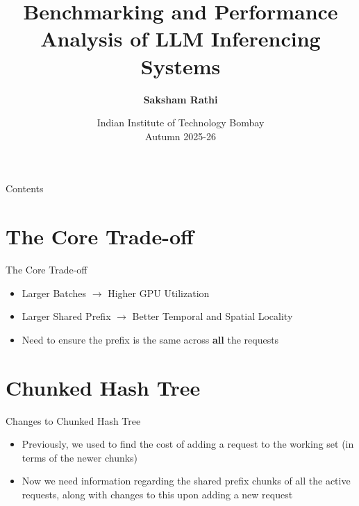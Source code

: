 \documentclass[Serif, 10pt, brown]{beamer}
\title[{Systems for LLMs}]{\sc Benchmarking and Performance Analysis of LLM Inferencing Systems}
\author[\ul{Saksham}]{{\textbf{Saksham Rathi}}}
\institute[UTD]{\sc\small Systems for LLMs\\ Under Prof. Mythili Vutukuru}
\date[UCI]{Indian Institute of Technology Bombay \\ Autumn 2025-26}
\theoremstyle{example}
\theoremstyle{plain}
\begin{document}
\frame{\titlepage}

\begin{frame}{Contents}
	\tableofcontents
\end{frame}

\section{The Core Trade-off}

\begin{frame}{The Core Trade-off}
    \begin{itemize}
        \item Larger Batches $\rightarrow$ Higher GPU Utilization
        \item Larger Shared Prefix $\rightarrow$ Better Temporal and Spatial Locality
        \item Need to ensure the prefix is the same across \textbf{all} the requests
    \end{itemize}
\end{frame}

\section{Chunked Hash Tree}

\begin{frame}{Changes to Chunked Hash Tree}
    \begin{itemize}
        \item Previously, we used to find the cost of adding a request to the working set (in terms of the newer chunks)
        \item Now we need information regarding the shared prefix chunks of all the active requests, along with changes to this upon adding a new request
    \end{itemize}
\end{frame}
\end{document}
